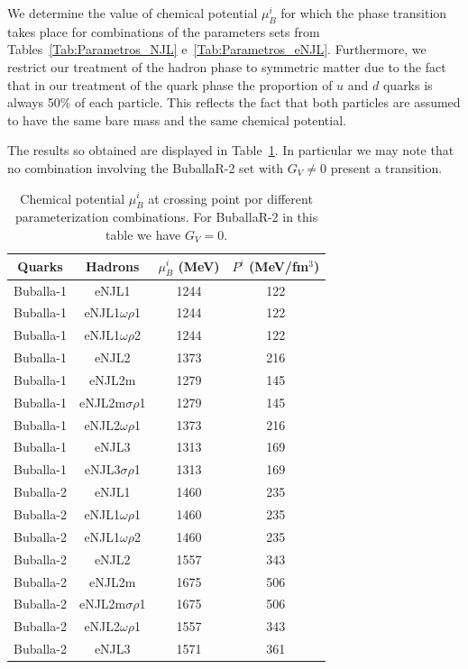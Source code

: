 \documentclass[prc, reprint, amsmath, floatfix,10pt]{revtex4-1}
\begin{document}
We determine the value of chemical potential $\mu_B^i$ for which the phase transition takes place for combinations of the parameters sets from Tables~\ref{Tab:Parametros_NJL} e~\ref{Tab:Parametros_eNJL}. Furthermore, we restrict our treatment of the hadron phase to symmetric matter due to the fact that in our treatment of the quark phase the proportion of $u$ and $d$ quarks is always 50\% of each particle. This reflects the fact that both particles are assumed to have the same bare mass and the same chemical potential.

The results so obtained are displayed in Table~\ref{Tab:Transition_chemical_pot}. In particular we may note that no combination involving the BuballaR-2 set with $G_V \neq 0$ present a transition.


\begin{table}[!htpb]
\centering
\caption{Chemical potential $\mu_B^i$ at crossing point por different parameterization combinations. For BuballaR-2 in this table we have $G_V = 0$.\label{Tab:Transition_chemical_pot}}
\begin{ruledtabular}
\begin{tabular}{cccc}
Quarks & Hadrons & $\mu_B^i$ (MeV) & $P^i$ (MeV/fm$^3$) \\
\hline
Buballa-1 & eNJL1 & 1244 & 122\\
Buballa-1 & eNJL1$\omega\rho$1 & 1244 & 122 \\
Buballa-1 & eNJL1$\omega\rho$2 & 1244 & 122 \\
Buballa-1 & eNJL2 & 1373 & 216\\
Buballa-1 & eNJL2m & 1279 & 145\\
Buballa-1 & eNJL2m$\sigma\rho$1 & 1279 & 145 \\
Buballa-1 & eNJL2$\omega\rho$1 & 1373 & 216 \\
Buballa-1 & eNJL3 & 1313 & 169\\
Buballa-1 & eNJL3$\sigma\rho$1 & 1313 & 169 \\
Buballa-2 & eNJL1 & 1460 & 235\\
Buballa-2 & eNJL1$\omega\rho$1 & 1460 & 235 \\
Buballa-2 & eNJL1$\omega\rho$2 & 1460 & 235 \\
Buballa-2 & eNJL2 & 1557 & 343\\
Buballa-2 & eNJL2m & 1675 & 506\\
Buballa-2 & eNJL2m$\sigma\rho$1 & 1675 & 506 \\
Buballa-2 & eNJL2$\omega\rho$1 & 1557 & 343 \\
Buballa-2 & eNJL3 & 1571 & 361 \\

\end{tabular}
\end{ruledtabular}
\end{table}
\end{document}

